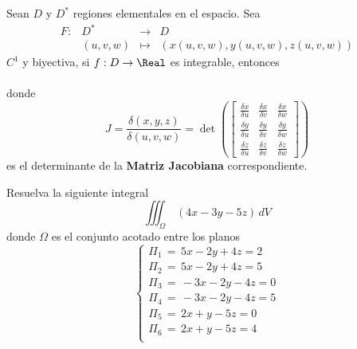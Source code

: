 \begin{frame}
  \begin{thm}
  Sean $D$ y $D^*$ regiones elementales en el espacio. Sea 
  $$\begin{array}{rrcl}
  F:&D^*  &\to    & D\\
    &(u,v,w)&\mapsto& (x(u,v,w),y(u,v,w),z(u,v,w))
  \end{array}$$
  $C^1$ y biyectiva, si $f:D\to\Real$ es integrable, entonces\\
  \vspace{5mm}
  \\
  \vspace{5mm}
  donde
  $$J=\frac{\delta(x,y,z)}{\delta(u,v,w)} = 
    \det\left(\left[\begin{array}{rrr}
    \frac{\delta x}{\delta u} & \frac{\delta x}{\delta v} & \frac{\delta x}{\delta w}\\
    \frac{\delta y}{\delta u} & \frac{\delta y}{\delta v} & \frac{\delta y}{\delta w}\\
    \frac{\delta z}{\delta u} & \frac{\delta z}{\delta v} & \frac{\delta z}{\delta w}
  \end{array}\right]\right)$$
  es el determinante de la {\bf Matriz Jacobiana} correspondiente.
  \end{thm}
\end{frame}

\begin{frame}
  \begin{eg}
    Resuelva la siguiente integral
    $$\iiint_{\Omega}\,(4x-3y-5z)\,dV$$
    \noindent donde $\Omega$ es el conjunto acotado entre los planos
    $$\left\{\begin{array}{l}
      \Pi_1\,=\,5x-2y+4z=2\\
      \Pi_2\,=\,5x-2y+4z=5\\
      \Pi_3\,=\,-3x-2y-4z=0\\
      \Pi_4\,=\,-3x-2y-4z=5\\
      \Pi_5\,=\,2x+y-5z=0\\
      \Pi_6\,=\,2x+y-5z=4\\
    \end{array}\right.$$
  \end{eg}
\end{frame}

